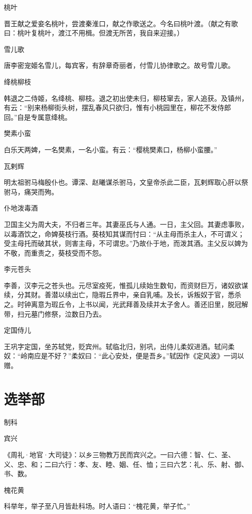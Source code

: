 \documentclass[a4paper,12pt,UTF8,twoside]{ctexbook}
\begin{document}
    桃叶
    
    晋王献之爱妾名桃叶，尝渡秦淮口，献之作歌送之。今名曰桃叶渡。（献之有歌曰：桃叶复桃叶，渡江不用楫。但渡无所苦，我自来迎接。）
    
    雪儿歌
    
    唐李密宠姬名雪儿，每宾客，有辞章奇丽者，付雪儿协律歌之。故号雪儿歌。
    
    绛桃柳枝
    
    韩退之二侍姬，名绛桃、柳枝。退之初出使未归，柳枝窜去，家人追获。及镇州，有云：“别来杨柳街头树，摆乱春风只欲归，惟有小桃园里在，柳花不发侍郎回。”自是专属意绛桃。
    
    樊素小蛮
    
    白乐天两婢，一名樊素，一名小蛮。有云：“樱桃樊素口，杨柳小蛮腰。”
    
    瓦剌辉
    
    明太祖驸马梅殷仆也。谭深、赵曦谋杀驸马，文皇帝杀此二臣，瓦剌辉取心肝以祭驸马，痛哭而殉。
    
    仆地泼毒酒
    
    卫国主父为周大夫，不归者三年。其妻巫氏与人通。一日，主父回。其妻虑事败，以毒酒饮之，命婢葵枝行酒。葵枝知其谋而忖曰：“从主母而杀主人，不可谓义；受主母托而破其状，则害主母，不可谓忠。”乃故仆于地，而泼其酒。主父反以婢为不敬，而重责之，葵枝受而不怨。
    
    李元苍头
    
    李善，汉李元之苍头也。元尽室疫死，惟孤儿续始生数旬，而资财巨万，诸奴欲谋续，分其财。善潜以续出亡，隐瑕丘界中，亲自乳哺。及长，诉叛奴于官，悉杀之。时钟离意为瑕丘令，上书以闻，光武拜善及续并太子舍人。善还旧里，脱冠解带，扫元墓门修祭，泣数日乃去。
    
    定国侍儿
    
    王巩字定国，坐苏轼党，贬宾州。轼临北归，别巩，出侍儿柔奴进酒。轼问柔奴：“岭南应是不好？”柔奴曰：“此心安处，便是吾乡。”轼因作《定风波》一词以赠。
    
    
    
    \part{选举部}
    制科
    
    宾兴
    
    《周礼·地官·大司徒》：以乡三物教万民而宾兴之。一曰六德：智、仁、圣、义、忠、和；二曰六行：孝、友、睦、姻、任、恤；三曰六艺：礼、乐、射、御、书、数。
    
    槐花黄
    
    科举年，举子至八月皆赴科场。时人语曰：“槐花黄，举子忙。”
    
\end{document}
